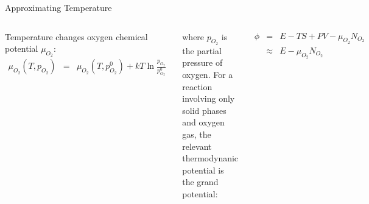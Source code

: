 \documentclass[aspectratio=169]{beamer}
\begin{document}
    \begin{frame}{Approximating Temperature}
        \begin{columns}
            Temperature changes oxygen chemical potential $\mu_{O_2}$:
            \begin{eqnarray*}
                \mu_{O_2}(T, p_{O_2}) & = & \mu_{O_2}(T, p_{O_2}^0)+ kT \ln \frac{p_{O_2}}{p_{O_2}^0}
            \end{eqnarray*}

            where $p_{O_2}$ is the partial pressure of oxygen.\newline
            \newline
            For a reaction involving only solid phases and oxygen gas, the relevant thermodynanic potential is the grand potential:\cite{ongLiFeO22008}

            \begin{eqnarray*}
                \phi & = & E - TS + PV - \mu_{O_2} N_{O_2}\\
                & \approx & E - \mu_{O_2} N_{O_2}
            \end{eqnarray*}



\end{columns}
\end{frame}
\end{document}

